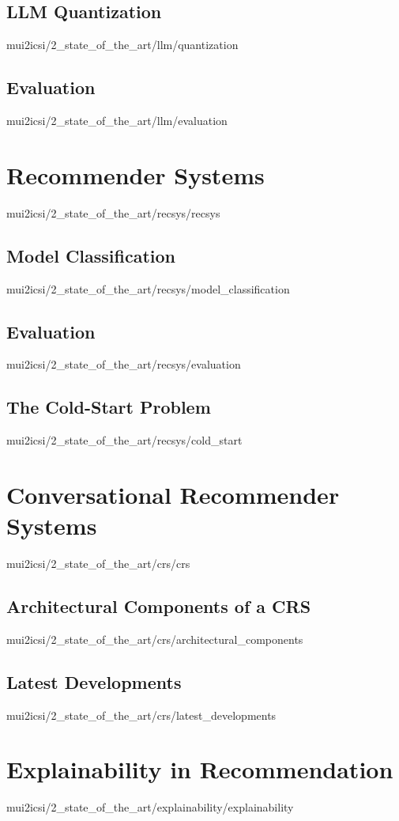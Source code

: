 \documentclass[english,epsbased,copyright,final,printable,covers,extendedindex,firstnumbered,tfm,gnuplot,loc,loe,lof,lot]{tfgtfmthesisuam}
\begin{document}
      \subsection{LLM Quantization\label{SS:QUANTIZATION}}{mui2icsi/2_state_of_the_art/llm/quantization}
      \subsection{Evaluation\label{SS:EVALUATION}}{mui2icsi/2_state_of_the_art/llm/evaluation}

    \section{Recommender Systems\label{SEC:RECSYS}}{mui2icsi/2_state_of_the_art/recsys/recsys}
      \subsection{Model Classification\label{SS:MODELCLASS}}{mui2icsi/2_state_of_the_art/recsys/model_classification}
      \subsection{Evaluation\label{SS:RECSYSEVAL}}{mui2icsi/2_state_of_the_art/recsys/evaluation}
      \subsection{The Cold-Start Problem\label{SS:COLDSTART}}{mui2icsi/2_state_of_the_art/recsys/cold_start}

    \section{Conversational Recommender Systems\label{SEC:CRS}}{mui2icsi/2_state_of_the_art/crs/crs}
      \subsection{Architectural Components of a CRS\label{SS:CRSARCH}}{mui2icsi/2_state_of_the_art/crs/architectural_components}
      \subsection{Latest Developments\label{SS:CRSDEVS}}{mui2icsi/2_state_of_the_art/crs/latest_developments}

    \section{Explainability in Recommendation\label{SEC:EXPLAINABILITY}}{mui2icsi/2_state_of_the_art/explainability/explainability}
\end{document}
